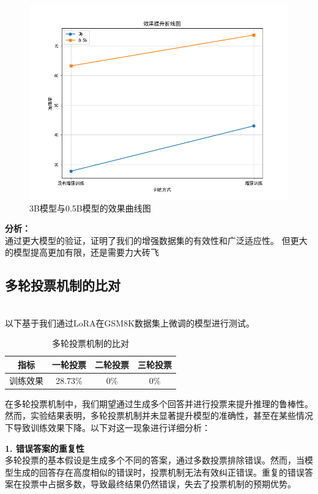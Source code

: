 \documentclass{article}
\begin{document}
\begin{figure}[H]
  \centering
  \includegraphics[width=1\textwidth]{compare_graph.png} %
  \caption{3B模型与0.5B模型的效果曲线图} %
  \label{fig:my_label1} %
\end{figure}

\textbf{分析：}\\
通过更大模型的验证，证明了我们的增强数据集的有效性和广泛适应性。
但更大的模型提高更加有限，还是需要力大砖飞


\subsection{多轮投票机制的比对}
\\以下基于我们通过LoRA在GSM8K数据集上微调的模型进行测试。
\begin{table}[H]
  \caption{多轮投票机制的比对}
  \label{voting-mechanism-comparison}
  \centering
  \begin{tabular}{|c|c|c|c|}
    \hline
    \textbf{指标}  & \textbf{一轮投票}  & \textbf{二轮投票}& \textbf{三轮投票}\\ \hline 
    训练效果 & 28.73\%  & 0\%& 0\% \\ \hline
  \end{tabular}
\end{table}

在多轮投票机制中，我们期望通过生成多个回答并进行投票来提升推理的鲁棒性。然而，实验结果表明，多轮投票机制并未显著提升模型的准确性，甚至在某些情况下导致训练效果下降。以下对这一现象进行详细分析：


\textbf{1. 错误答案的重复性}\\
多轮投票的基本假设是生成多个不同的答案，通过多数投票排除错误。然而，当模型生成的回答存在高度相似的错误时，投票机制无法有效纠正错误。重复的错误答案在投票中占据多数，导致最终结果仍然错误，失去了投票机制的预期优势。
\end{document}
